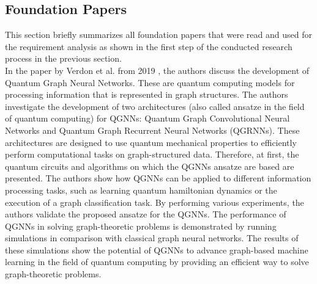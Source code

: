 \subsection{Foundation Papers}
This section briefly summarizes all foundation papers that were read and used for the requirement analysis as shown in the first step of the conducted research process in the previous section. \\

In the paper by Verdon et al. from 2019 \cite{verdon_quantum_2019}, the authors discuss the development of Quantum Graph Neural Networks. These are quantum computing models for processing information that is represented in graph structures. The authors investigate the development of two architectures (also called ansatze in the field of quantum computing) for QGNNs: Quantum Graph Convolutional Neural Networks and Quantum Graph Recurrent Neural Networks (QGRNNs). These architectures are designed to use quantum mechanical properties to efficiently perform computational tasks on graph-structured data. Therefore, at first, the quantum circuits and algorithms on which the QGNNs ansatze are based are presented. The authors show how QGNNs can be applied to different information processing tasks, such as learning quantum hamiltonian dynamics or the execution of a graph classification task. By performing various experiments, the authors validate the proposed ansatze for the QGNNs. The performance of QGNNs in solving graph-theoretic problems is demonstrated by running simulations in comparison with classical graph neural networks. The results of these simulations show the potential of QGNNs to advance graph-based machine learning in the field of quantum computing by providing an efficient way to solve graph-theoretic problems. \\

